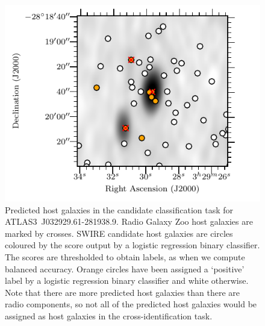 \documentclass[fleqn,usenatbib,usedcolumn]{mnras}
\newcommand{\edited}[1]{#1}
\begin{document}
    \begin{figure}
      \centering
      \includegraphics[width=\columnwidth]{images/positives.pdf}
      \caption{Predicted host galaxies in the candidate classification task for ATLAS3~J032929.61-281938.9. Radio Galaxy Zoo host galaxies
      are marked by crosses. SWIRE candidate host galaxies are circles coloured by \edited{the score output by a logistic regression binary classifier. The scores are thresholded to obtain labels, as when we compute balanced accuracy.} Orange circles have been assigned a `positive' label by a logistic regression binary classifier and white otherwise. \edited{Note that there are more predicted host galaxies than there are radio components, so not all of the predicted host galaxies would be assigned as host galaxies in the cross-identification task.}
      \label{fig:positives}}
    \end{figure}
\end{document}
